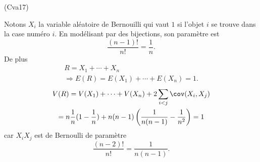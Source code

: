  \begin{tiny}(Cva17)\end{tiny} Notons $X_i$ la variable aléatoire de Bernouilli qui vaut $1$ si l'objet $i$ se trouve dans la case numéro $i$. En modélisant par des bijections, son paramètre est 
 \[
  \frac{(n-1)!}{n!} = \frac{1}{n}.
 \]
De plus
 \begin{multline*}
  R = X_1 + \cdots + X_n \\
  \Rightarrow E(R) = E(X_1) + \cdots + E(X_n) = 1.
 \end{multline*}
\begin{multline*}
 V(R) = V(X_1) + \cdots + V(X_n) + 2\sum_{i < j} \cov(X_i,X_j)\\
 = n \frac{1}{n}(1-\frac{1}{n}) + n(n-1)\left( \frac{1}{n(n-1)} - \frac{1}{n^2}\right) = 1
\end{multline*}
car $X_iX_j$ est de Bernoulli de paramètre 
\[
 \frac{(n-2)!}{n!} =\frac{1}{n(n-1)}.
\]
